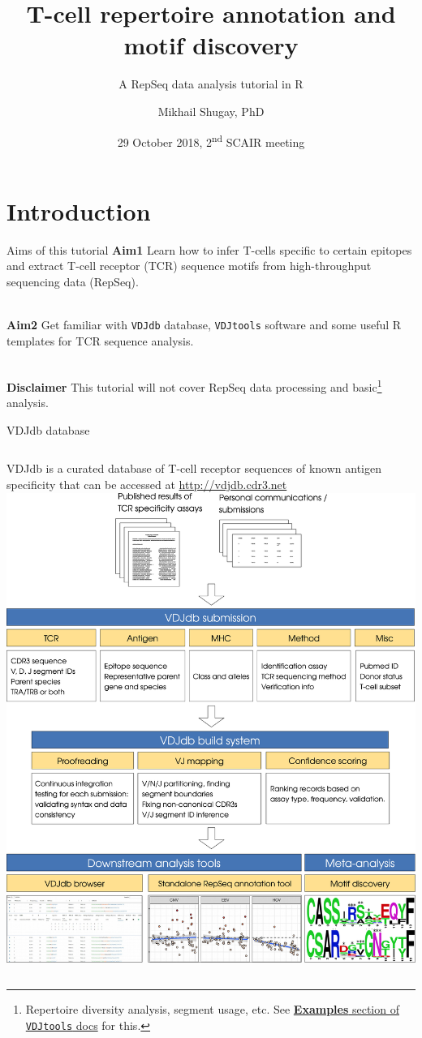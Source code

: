 \documentclass[12pt]{beamer}
\author{Mikhail Shugay, PhD}
\title{T-cell repertoire annotation and motif discovery}
\subtitle{A RepSeq data analysis tutorial in R}
\institute[Skoltech]{\texttt {Skolkovo Institute of Science and Technology}}
\date{29 October 2018, 2\textsuperscript{nd} SCAIR meeting}
\begin{document}
\maketitle

\section{Introduction}

\begin{frame}{Aims of this tutorial}
\textbf{Aim1} Learn how to infer T-cells specific to certain epitopes and extract T-cell receptor (TCR) sequence motifs from high-throughput sequencing data (RepSeq).\\~\

\textbf{Aim2} Get familiar with \texttt{VDJdb} database, \texttt{VDJtools} software and some useful R templates for TCR sequence analysis.\\~\

\textbf{Disclaimer} This tutorial will not cover RepSeq data processing and basic\footnote{Repertoire diversity analysis, segment usage, etc. See \href{https://vdjtools-doc.readthedocs.io/en/master/examples.html}{\textbf{Examples} section of \texttt{VDJtools} docs} for this.} analysis.
\end{frame}

\begin{frame}{VDJdb database}
\begin{columns}
VDJdb is a curated database of T-cell receptor sequences of known antigen specificity that can be accessed at \url{http://vdjdb.cdr3.net}
\includegraphics[width=\textwidth]{vdjdb_splash}
\end{columns}
\end{frame}
\end{document}
